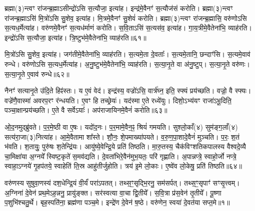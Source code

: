 ब्रह्मा(३)न्त्वꣳ रा॑जन्ब्र॒ह्मा\-ऽसीन्द्रो॑ऽसि स॒त्यौजा॒ इत्या॑ह।
इन्द्र॑मे॒वैनꣳ॑ स॒त्यौज॑सं करोति।
ब्रह्मा(३)न्त्वꣳ रा॑जन्ब्र॒ह्माऽसि॑ मि॒त्रो॑ऽसि सु॒शेव॒ इत्या॑ह।
मि॒त्रमे॒वैनꣳ॑ सु॒शेवं॑ करोति।
ब्रह्मा(३)न्त्वꣳ रा॑जन्ब्र॒ह्मासि॒ वरु॑णोऽसि स॒त्यध॒र्मेत्या॑ह।
वरु॑णमे॒वैनꣳ॑ स॒त्यध॑र्माणं करोति।
स॒वि॒ताऽसि॑ स॒त्यस॑व॒ इत्या॑ह।
गा॒य॒त्रीमे॒वैतेना॑भि॒ व्याह॑रति।
इन्द्रो॑ऽसि स॒त्यौजा॒ इत्या॑ह।
त्रि॒ष्टुभ॑मे॒वैतेना॑भि॒ व्याह॑रति॥६१॥

मि॒त्रो॑ऽसि सु॒शेव॒ इत्या॑ह।
जग॑तीमे॒वैतेना॑भि॒ व्याह॑रति।
स॒त्यमे॒ता दे॒वताः᳚।
स॒त्यमे॒तानि॒ छन्दाꣳ॑सि।
स॒त्यमे॒वाव॑\- रुन्धे।
वरु॑णोऽसि स॒त्यध॒र्मेत्या॑ह।
अ॒नु॒ष्टुभ॑मे॒वैतेना॑भि॒ व्याह॑रति।
स॒त्या॒नृ॒ते वा अ॑नु॒ष्टुप्।
स॒त्या॒नृ॒ते वरु॑णः।
स॒त्या॒नृ॒ते ए॒वाव॑ रुन्धे॥६२॥

नैनꣳ॑ सत्यानृ॒ते उ॑दि॒ते हिꣴ॑स्तः।
य ए॒वं वेद॑।
इन्द्र॑स्य॒ वज्रो॑ऽसि॒ वार्त्र॑घ्न॒ इति॒ स्फ्यं प्रय॑च्छति।
वज्रो॒ वै स्फ्यः।
वज्रे॑णै॒वास्मा॑ अवरप॒रꣳ र॑न्धयति।
ए॒वꣳ हि तच्छ्रेयः॑।
यद॑स्मा ए॒ते रध्ये॑युः।
दिशो॒\-ऽभ्य॑यꣳ राजा॑\-ऽभू॒दिति॒ पञ्चा॒क्षान्प्रय॑च्छति।
ए॒ते वै सर्वे\-ऽयाः᳚।
अप॑राजायिनमे॒वैनं॑ करोति॥६३॥

ओ॒द॒नमुद्ब्रु॑वते।
प॒र॒मे॒ष्ठी वा ए॒षः।
यदो॑द॒नः।
प॒र॒मामे॒वैन॒ꣴ॒ श्रियं॑ गमयति।
सुश्लो॒काँ(४) सुम॑ङ्ग॒लाँ(४) सत्य॑रा॒जा(३)\-नित्या॑ह।
आ॒\-मे॒वैतामा शा᳚स्ते।
शौ॒नः॒ शे॒पमाख्या॑पयते।
व॒रु॒ण॒पा॒शादे॒वैनं॑ मुञ्चति।
प॒रः॒ श॒तं भ॑वति।
श॒तायुः॒ पुरु॑षः श॒तेन्द्रि॑यः।
आयु॑ष्ये॒वेन्द्रि॒ये प्रति॑ तिष्ठति।
मा॒रु॒तस्य॒ चैक॑विꣳशतिकपालस्य वैश्वदे॒व्यै चा॒मिक्षा॑या अ॒ग्नये᳚ स्विष्ट॒कृते॑ स॒मव॑द्यति।
दे॒वता॑भिरे॒वैन॑मुभ॒यतः॒ परि॑ गृह्णाति।
अ॒पान्नप्त्रे॒ स्वाहो॒र्जो नप्त्रे॒ स्वाहा॒\-ऽग्नये॑ गृ॒हप॑तये॒ स्वाहेति॑ ति॒स्र आहु॑तीर्जुहोति।
त्रय॑ इ॒मे लो॒काः।
ए॒ष्वे॑व लो॒केषु॒ प्रति॑ तिष्ठति॥६४॥\anuvakamend[दे॒वैरित्या॑ह स॒त्यस॑वं करोति त्रि॒ष्टुभ॑मे॒वैतेना॑भि॒ व्याह॑रति सत्यानृ॒ते ए॒वाव॑ रुन्धे करोति श॒तेन्द्रि॑यः॒ षट् च॑]




\clearpage
{}
\setcounter{anuvakam}{0}

वरु॑णस्य सुषुवा॒णस्य॑ दश॒धेन्द्रि॒यं वी॒र्यं॑ परा॑\-ऽपतत्।
तथ्स॒ꣳ॒सृद्भि॒रनु॒\- सम॑सर्पत्।
तथ्स॒ꣳ॒सृपाꣳ॑ सꣳसृ॒त्त्वम्।
अ॒ग्निना॑ दे॒वेन॑ प्रथ॒मे\-ऽह॒न्ननु॒ प्रायु॑ङ्क्त।
सर॑स्वत्या वा॒चा द्वि॒तीये᳚।
स॒वि॒त्रा प्र॑स॒वेन॑ तृ॒तीये᳚।
पू॒ष्णा प॒शुभि॑श्चतु॒र्थे।
बृह॒स्पति॑ना॒ ब्रह्म॑णा पञ्च॒मे।
इन्द्रे॑ण दे॒वेन॑ ष॒ष्ठे।
वरु॑णेन॒ स्वया॑ दे॒वत॑या सप्त॒मे॥१॥

